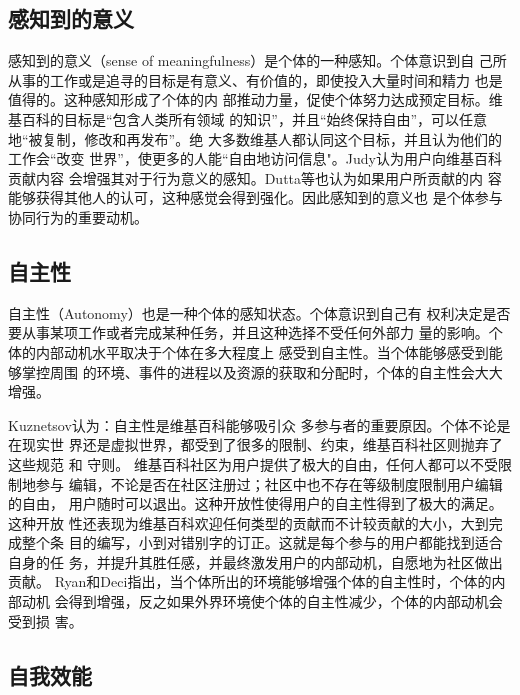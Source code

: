 \subsection{感知到的意义}
\label{sec:sense-of-meaning}

感知到的意义（sense of meaningfulness）是个体的一种感知。个体意识到自
己所从事的工作或是追寻的目标是有意义、有价值的，即使投入大量时间和精力
也是值得的。这种感知形成了个体的内
部推动力量，促使个体努力达成预定目标。维基百科的目标是“包含人类所有领域
的知识”，并且“始终保持自由”，可以任意地“被复制，修改和再发布”。绝
大多数维基人都认同这个目标，并且认为他们的工作会“改变
世界”，使更多的人能“自由地访问信息"\cite{Zhang2006}。Judy认为用户向维基百科贡献内容
会增强其对于行为意义的感知\cite{citeulike:3063318}。Dutta等也认为如果用户所贡献的内
容能够获得其他人的认可，这种感觉会得到强化\cite{dutta2008wikipedia}。因此感知到的意义也
是个体参与协同行为的重要动机。

\subsection{自主性}
\label{sec:self-determination}

自主性（Autonomy）也是一种个体的感知状态。个体意识到自己有
权利决定是否要从事某项工作或者完成某种任务，并且这种选择不受任何外部力
量的影响\cite{ryan2000self}。个体的内部动机水平取决于个体在多大程度上
感受到自主性。当个体能够感受到能够掌控周围
的环境、事件的进程以及资源的获取和分配时，个体的自主性会大大增强。

Kuznetsov认为：自主性是维基百科能够吸引众
多参与者的重要原因\cite{kuznetsov2006motivations}。个体不论是在现实世
界还是虚拟世界，都受到了很多的限制、约束，维基百科社区则抛弃了这些规范
和
守则。
维基百科社区为用户提供了极大的自由，任何人都可以不受限制地参与
编辑，不论是否在社区注册过；社区中也不存在等级制度限制用户编辑的自由，
用户随时可以退出。这种开放性使得用户的自主性得到了极大的满足。这种开放
性还表现为维基百科欢迎任何类型的贡献而不计较贡献的大小，大到完成整个条
目的编写，小到对错别字的订正。这就是每个参与的用户都能找到适合自身的任
务，并提升其胜任感，并最终激发用户的内部动机，自愿地为社区做出贡献。
Ryan和Deci指出，当个体所出的环境能够增强个体的自主性时，个体的内部动机
会得到增强，反之如果外界环境使个体的自主性减少，个体的内部动机会受到损
害\cite{ryan2000intrinsic}。

\subsection{自我效能}
\label{sec:self-efficacy}

